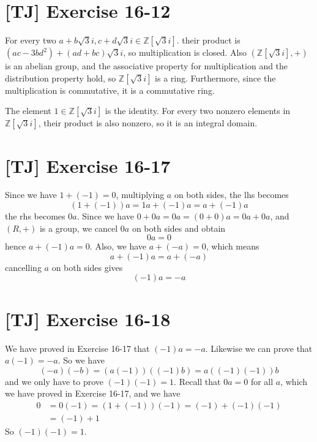 \documentclass[a4paper,11pt,twocolumn]{article}
\begin{document}
  \section{[TJ] Exercise 16-12}
  For every two $a+b\sqrt{3}i, c+d\sqrt{3}i \in \mathbb{Z}[\sqrt{3}i]$. their product is $(ac - 3bd^2) + (ad + bc)\sqrt{3}i$, so multiplication is closed. Also $(\mathbb{Z}[\sqrt{3}i], +)$ is an abelian group, and the associative property for multiplication and the distribution property hold, so $\mathbb{Z}[\sqrt{3}i]$ is a ring. Furthermore, since the multiplication is commutative, it is a commutative ring. \par
  The element $1 \in \mathbb{Z}[\sqrt{3}i]$ is the identity. For every two nonzero elements in $\mathbb{Z}[\sqrt{3}i]$, their product is also nonzero, so it is an integral domain. \par

  \section{[TJ] Exercise 16-17}
  Since we have $1 + (-1) = 0$, multiplying $a$ on both sides, the lhs becomes
  $$ (1 + (-1)) a = 1a + (-1)a = a + (-1)a $$
  the rhs becomes $0a$. Since we have $0 + 0a = 0a = (0+0)a = 0a + 0a$, and $(R, +)$ is a group, we cancel $0a$ on both sides and obtain
  $$ 0a = 0 $$
  hence $a + (-1)a = 0$. Also, we have $a + (-a) = 0$, which means
  $$a + (-1)a = a + (-a)$$
  cancelling $a$ on both sides gives
  $$(-1)a = -a$$

  \section{[TJ] Exercise 16-18}
  We have proved in Exercise 16-17 that $(-1)a = -a$. Likewise we can prove that $a(-1) = -a$. So we have
  $$ (-a)(-b) = (a(-1))((-1)b) = a((-1)(-1))b $$
  and we only have to prove $(-1)(-1) = 1$. Recall that $0a = 0$ for all $a$, which we have proved in Exercise 16-17, and we have
  \begin{align*}
    0 &= 0(-1) = (1+(-1))(-1) = (-1) + (-1)(-1) \\
      &= (-1) + 1
  \end{align*}
  So $(-1)(-1) = 1$.
\end{document}
